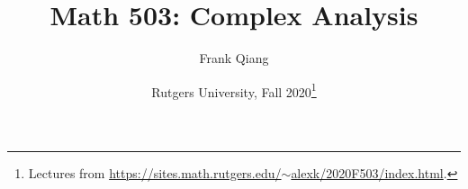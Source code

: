 \documentclass[12pt, letterpaper, oneside]{book}
\title{Math 503: Complex Analysis}
\author{Frank Qiang}
\date{Rutgers University, Fall 2020\footnote{Lectures from \href{https://sites.math.rutgers.edu/~alexk/2020F503/index.html}{https://sites.math.rutgers.edu/$\sim$alexk/2020F503/index.html}.}
}
\theoremstyle{definition}
\begin{document}
  \maketitle

  \begingroup
  \let\cleardoublepage\clearpage
  \tableofcontents
  \endgroup

  
  
  
  
\end{document}

